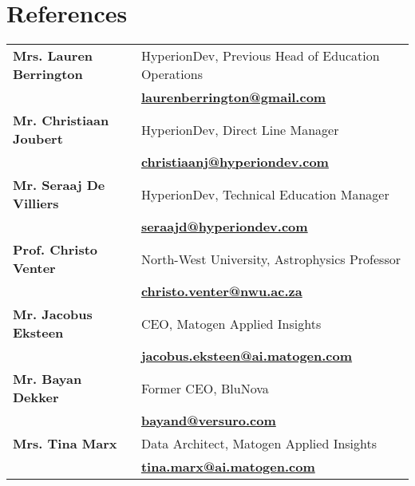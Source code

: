 \documentclass[a4paper,10pt]{article}
\begin{document}
\section*{References}
	\begin{tabularx}{\textwidth}{l X}
	\textbf{Mrs. Lauren Berrington} & HyperionDev, Previous Head of Education Operations \\
	& \faEnvelope \quad \href{mailto:laurenberrington@gmail.com}{\textbf{laurenberrington@gmail.com}} \\[0.1cm]
	
	\textbf{Mr. Christiaan Joubert} & HyperionDev, Direct Line Manager \\
	& \faEnvelope \quad \href{mailto:christiaanj@hyperiondev.com}{\textbf{christiaanj@hyperiondev.com}} \\[0.1cm]
		
	\textbf{Mr. Seraaj De Villiers} & HyperionDev, Technical Education Manager \\
	& \faEnvelope \quad \href{mailto:seraajd@hyperiondev.com}{\textbf{seraajd@hyperiondev.com}} \\[0.1cm]
	
	\textbf{Prof. Christo Venter} & North-West University, Astrophysics Professor \\
	& \faEnvelope \quad \href{mailto:christo.venter@nwu.ac.za}{\textbf{christo.venter@nwu.ac.za}} \\[0.1cm]
	
	\textbf{Mr. Jacobus Eksteen} & CEO, Matogen Applied Insights \\
	& \faEnvelope \quad \href{mailto:jacobus.eksteen@ai.matogen.com}{\textbf{jacobus.eksteen@ai.matogen.com}} \\[0.1cm]
	
	\textbf{Mr. Bayan Dekker} & Former CEO, BluNova\\
	& \faEnvelope \quad \href{mailto:bayand@versuro.com}{\textbf{bayand@versuro.com}} \\[0.1cm]
	
	\textbf{Mrs. Tina Marx} & Data Architect, Matogen Applied Insights\\
	& \faEnvelope \quad \href{mailto:tina.marx@ai.matogen.com}{\textbf{tina.marx@ai.matogen.com}} \\[0.1cm]
\end{tabularx}
	
\end{document}
